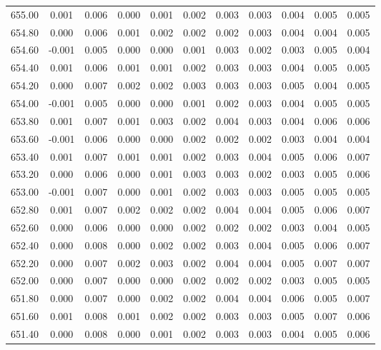 \begin{longtable}{cccccccccc}
    655.00 &  0.001 &  0.006 &  0.000 &  0.001 &  0.002 &  0.003 &  0.003 &  0.004 &  0.005 &  0.005 \\
    654.80 &  0.000 &  0.006 &  0.001 &  0.002 &  0.002 &  0.002 &  0.003 &  0.004 &  0.004 &  0.005 \\
    654.60 & -0.001 &  0.005 &  0.000 &  0.000 &  0.001 &  0.003 &  0.002 &  0.003 &  0.005 &  0.004 \\
    654.40 &  0.001 &  0.006 &  0.001 &  0.001 &  0.002 &  0.003 &  0.003 &  0.004 &  0.005 &  0.005 \\
    654.20 &  0.000 &  0.007 &  0.002 &  0.002 &  0.003 &  0.003 &  0.003 &  0.005 &  0.004 &  0.005 \\
    654.00 & -0.001 &  0.005 &  0.000 &  0.000 &  0.001 &  0.002 &  0.003 &  0.004 &  0.005 &  0.005 \\
    653.80 &  0.001 &  0.007 &  0.001 &  0.003 &  0.002 &  0.004 &  0.003 &  0.004 &  0.006 &  0.006 \\
    653.60 & -0.001 &  0.006 &  0.000 &  0.000 &  0.002 &  0.002 &  0.002 &  0.003 &  0.004 &  0.004 \\
    653.40 &  0.001 &  0.007 &  0.001 &  0.001 &  0.002 &  0.003 &  0.004 &  0.005 &  0.006 &  0.007 \\
    653.20 &  0.000 &  0.006 &  0.000 &  0.001 &  0.003 &  0.003 &  0.002 &  0.003 &  0.005 &  0.006 \\
    653.00 & -0.001 &  0.007 &  0.000 &  0.001 &  0.002 &  0.003 &  0.003 &  0.005 &  0.005 &  0.005 \\
    652.80 &  0.001 &  0.007 &  0.002 &  0.002 &  0.002 &  0.004 &  0.004 &  0.005 &  0.006 &  0.007 \\
    652.60 &  0.000 &  0.006 &  0.000 &  0.000 &  0.002 &  0.002 &  0.002 &  0.003 &  0.004 &  0.005 \\
    652.40 &  0.000 &  0.008 &  0.000 &  0.002 &  0.002 &  0.003 &  0.004 &  0.005 &  0.006 &  0.007 \\
    652.20 &  0.000 &  0.007 &  0.002 &  0.003 &  0.002 &  0.004 &  0.004 &  0.005 &  0.007 &  0.007 \\
    652.00 &  0.000 &  0.007 &  0.000 &  0.000 &  0.002 &  0.002 &  0.002 &  0.003 &  0.005 &  0.005 \\
    651.80 &  0.000 &  0.007 &  0.000 &  0.002 &  0.002 &  0.004 &  0.004 &  0.006 &  0.005 &  0.007 \\
    651.60 &  0.001 &  0.008 &  0.001 &  0.002 &  0.002 &  0.003 &  0.003 &  0.005 &  0.007 &  0.006 \\
    651.40 &  0.000 &  0.008 &  0.000 &  0.001 &  0.002 &  0.003 &  0.003 &  0.004 &  0.005 &  0.006 \\

\end{longtable}
